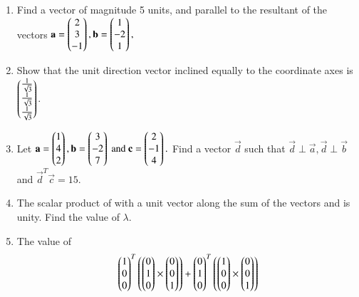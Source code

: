 \begin{enumerate}[label=\arabic*.,ref=\thesubsection.\theenumi]
\item Find a vector of magnitude 5 units, and parallel to the resultant of the vectors 
$
\mathbf{a}=\begin{pmatrix}2\\3\\-1\end{pmatrix},
\mathbf{b}=\begin{pmatrix}1\\-2\\1\end{pmatrix},
$
\\
\solution 

\item Show that the unit direction vector inclined equally to the coordinate axes is $\begin{pmatrix}\frac{1}{\sqrt{3}}\\\frac{1}{\sqrt{3}}\\ \frac{1}{\sqrt{3}}\end{pmatrix}$.
\\
\solution 

\item Let 
$
\mathbf{a}=\begin{pmatrix}1\\4\\2\end{pmatrix},
\mathbf{b}=\begin{pmatrix}3\\-2\\7\end{pmatrix} \text{ and }
\mathbf{c}=\begin{pmatrix}2\\-1\\4\end{pmatrix}.
$
Find a vector $\vec{d}$ such that $\vec{d}\perp\vec{a},\vec{d}\perp\vec{b}$ and $\vec{d}^T\vec{c} = 15$.
\\
\solution 

\item The scalar product of  with a unit vector along the sum  of the vectors  and  is unity.  Find the value of $\lambda$.
\item The value of 
\begin{multline}
\myvec{1\\0\\0}^T\brak{\myvec{0\\1\\0}\times \myvec{0\\0\\1}}
+\myvec{0\\1\\0}^T\brak{\myvec{1\\0\\0}\times \myvec{0\\0\\1}}

\end{multline}
\end{enumerate}
